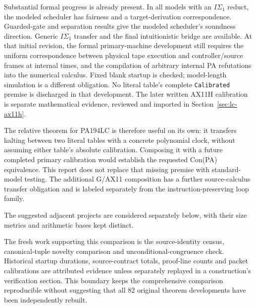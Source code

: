 Substantial formal progress is already present. In all models with an
$I\Sigma_1$ reduct, the modeled scheduler has fairness and a
target-derivation correspondence. Guarded-gate and separation results
give the modeled scheduler's soundness direction. Generic
$I\Sigma_1$ transfer and the final intuitionistic bridge are available.
At that initial revision, the formal primary-machine development still
requires the uniform correspondence between physical
tape execution and controller/source frames at internal times, and
the compilation of arbitrary internal PA refutations into the numerical
calculus. Fixed blank startup is checked; model-length simulation is a
different obligation. No literal table's complete \texttt{Calibrated}
premise is discharged in that development. The later written AX11H
calibration is separate mathematical evidence, reviewed and imported in
Section~\ref{sec:lc-ax11h}.\cite{pa-readme}

The relative theorem for PA194LC is therefore useful on its own: it
transfers halting between two literal tables with a concrete polynomial
clock, without assuming either table's absolute calibration. Composing
it with a future completed primary calibration would establish the
requested Con(PA) equivalence. This report does not replace that
missing premise with standard-model testing. The additional G/AX11
composition has a further source-calculus transfer obligation and is
labeled separately from the instruction-preserving loop family.

The suggested adjacent projects are considered separately below, with their
size metrics and arithmetic bases kept distinct.

The fresh work supporting this comparison is the source-identity census,
canonical-tuple novelty comparison and unconditional-congruence check.
Historical startup durations, source-contract totals, proof-line counts
and packet calibrations are attributed evidence unless separately
replayed in a construction's verification section. This boundary keeps
the comprehensive comparison reproducible without suggesting that all
82 original theorem developments have been independently rebuilt.
